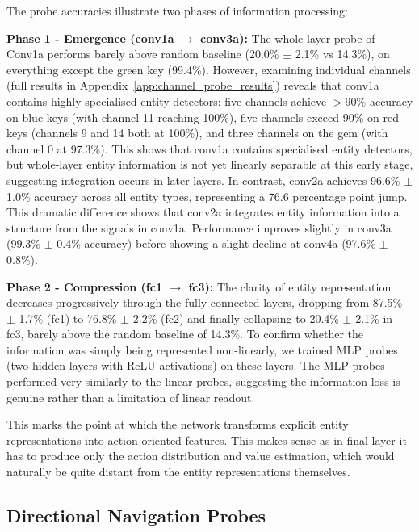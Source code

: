The probe accuracies illustrate two phases of information processing:

\textbf{Phase 1 - Emergence (conv1a $\rightarrow$ conv3a):} The whole layer probe of Conv1a performs barely above random baseline (20.0\% $\pm$ 2.1\% vs 14.3\%), on everything except the green key (99.4\%). However, examining individual channels (full results in Appendix~\ref{app:channel_probe_results}) reveals that conv1a contains highly specialised entity detectors: five channels achieve $>$90\% accuracy on blue keys (with channel 11 reaching 100\%), five channels exceed 90\% on red keys (channels 9 and 14 both at 100\%), and three channels on the gem (with channel 0 at 97.3\%). 
This shows that conv1a contains specialised entity detectors, but whole-layer entity information is not yet linearly separable at this early stage, suggesting integration occurs in later layers. In contrast, conv2a achieves 96.6\% $\pm$ 1.0\% accuracy across all entity types, representing a 76.6 percentage point jump. This dramatic difference shows that conv2a integrates entity information into a structure from the signals in conv1a. Performance improves slightly in conv3a (99.3\% $\pm$ 0.4\% accuracy) before showing a slight decline at conv4a (97.6\% $\pm$ 0.8\%).

\textbf{Phase 2 - Compression (fc1 $\rightarrow$ fc3):} The clarity of entity representation decreases progressively through the fully-connected layers, dropping from 87.5\% $\pm$ 1.7\% (fc1) to 76.8\% $\pm$ 2.2\% (fc2) and finally collapsing to 20.4\% $\pm$ 2.1\% in fc3, barely above the random baseline of 14.3\%. To confirm whether the information was simply being represented non-linearly, we trained MLP probes (two hidden layers with ReLU activations) on these layers. The MLP probes performed very similarly to the linear probes, suggesting the information loss is genuine rather than a limitation of linear readout. 

This marks the point at which the network transforms explicit entity representations into action-oriented features. This makes sense as in final layer it has to produce only the action distribution and value estimation, which would naturally be quite distant from the entity representations themselves.

\subsection{Directional Navigation Probes}
\label{subsec:directional_probes_results}

